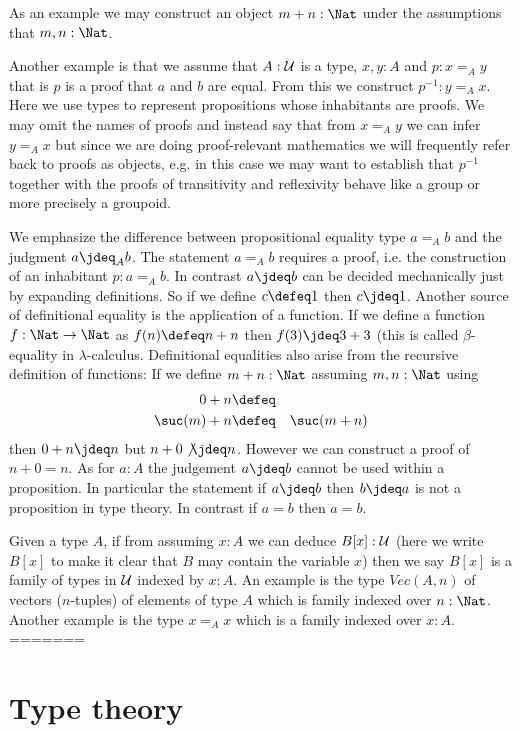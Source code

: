 {As an example we may
construct an object $m + n : \Nat$ under the assumptions that $m,n :
\Nat$. 

Another example is that we assume that $A:{\mathcal U}$ is a type, $x,y : A$
and $p : x =_A y$ that is $p$ is a proof that $a$ and $b$ are
equal. From this we construct $p^{-1} : y =_A x$. Here we use types to
represent propositions whose inhabitants are proofs. We may omit the
names of proofs and instead say that from $x =_A y$ we can infer $y
=_A x$ but since we are doing proof-relevant mathematics we will
frequently refer back to proofs as objects, e.g. in this case we may
want to establish that $p^{-1}$ together with the proofs of
transitivity and reflexivity behave like a group or more precisely a
groupoid.

We emphasize the difference between propositional equality type $a =_A
b$ and the judgment $a \jdeq_A b$. The statement $a =_A b$ requires a
proof, i.e. the construction of an inhabitant $p : a =_A b$. In
contrast $a \jdeq b$ can be decided mechanically just by expanding
definitions. So if we define $c \defeq 1$ then $c\jdeq 1$. Another
source of definitional equality is the application of a function. If
we define a function $f : \Nat \to \Nat$ as $f(n) \defeq n + n$ then
$f(3) \jdeq 3+3$ (this is called $\beta$-equality in
$\lambda$-calculus. Definitional equalities also arise from the
recursive definition of functions: If we define $m + n : \Nat$
assuming $m,n : \Nat$ using
\begin{eqnarray*}
  0 + n & \defeq & \\
  \suc(m) + n & \defeq & \suc(m + n)
\end{eqnarray*}
then $0 + n \jdeq n$ but $n + 0 \not\jdeq n$. However we can construct
a proof of $n + 0 = n$. As for $a : A$ the judgement $a \jdeq b$
cannot be used within a proposition. In particular the statement if $a
\jdeq b$ then $b \jdeq a$ is not a proposition in type theory. In
contrast if $a = b$ then $a = b$.

Given a type $A$, if from assuming $x:A$ we can deduce $B[x]:{\mathcal U}$ 
(here we write $B[x]$ to make it clear that $B$ may contain the
variable $x$) then we say $B[x]$ is a
family of types in ${\mathcal U}$ indexed by $x:A$. An example is the type $Vec(A,n)$ of
vectors ($n$-tuples) of elements of type $A$ which is family indexed
over $n : \Nat$. Another example is the type $x =_A x$ which is a
family indexed over $x : A$.
=======
\chapter{Type theory}
\label{cha:typetheory}

}
